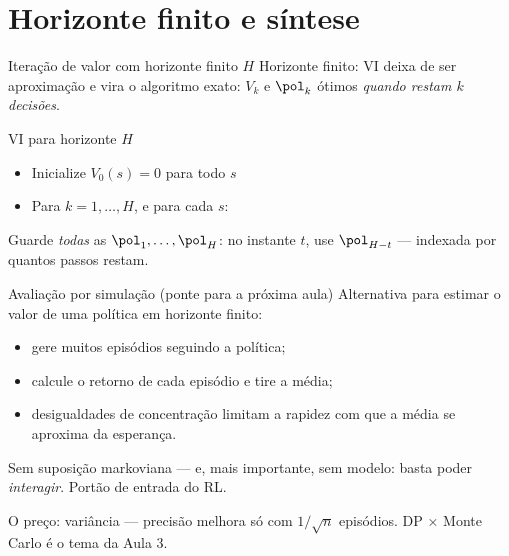 \documentclass[aspectratio=169, 11pt]{beamer}
\begin{document}
\section{Horizonte finito e síntese}

\begin{frame}{Iteração de valor com horizonte finito $H$}
  Horizonte finito: VI deixa de ser aproximação e vira \alert{o algoritmo exato}:
  $V_k$ e $\pol_k$ ótimos \emph{quando restam $k$ decisões}.
  \begin{algbox}{VI para horizonte $H$}
    \begin{itemize}\setlength{\itemsep}{0.2ex}
      \item Inicialize $V_0(s) = 0$ para todo $s$
      \item Para $k = 1, \dots, H$, e para cada $s$:
        \begin{center}
        \end{center}
    \end{itemize}
  \end{algbox}
  \vspace{-0.2em}
  \begin{ideiabox}
    Guarde \emph{todas} as $\pol_1, \dots, \pol_H$: no instante $t$, use $\pol_{H-t}$
    --- indexada por \alert{quantos passos restam}.
  \end{ideiabox}
\end{frame}

\begin{frame}{Avaliação por simulação (ponte para a próxima aula)}
  Alternativa para estimar o valor de uma política em horizonte finito:
  \begin{itemize}\setlength{\itemsep}{0.3ex}
    \item gere muitos \alert{episódios} seguindo a política;
    \item calcule o retorno de cada episódio e tire a \alert{média};
    \item desigualdades de concentração limitam a rapidez com que a média se
          aproxima da esperança.
  \end{itemize}
  \begin{ideiabox}
    Sem suposição markoviana --- e, mais importante, sem \alert{modelo}: basta poder
    \emph{interagir}. Portão de entrada do RL.
  \end{ideiabox}
  \begin{alertabox}
    O preço: variância --- precisão melhora só com $1/\sqrt{n}$ episódios. DP × Monte
    Carlo é o tema da Aula 3.
  \end{alertabox}
\end{frame}
\end{document}

